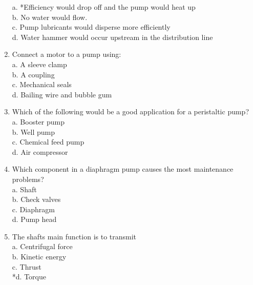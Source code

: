 \begin{enumerate}[1.]
a. *Efficiency would drop off and the pump would heat up\\
b. No water would flow.\\
c. Pump lubricants would disperse more efficiently\\
d. Water hammer would occur upstream in the distribution line\\
\item Connect a motor to a pump using:\\
a. A sleeve clamp\\
b. A coupling\\
c. Mechanical seals\\
d. Bailing wire and bubble gum\\
\item Which of the following would be a good application for a peristaltic pump?\\
a. Booster pump\\
b. Well pump\\
c. Chemical feed pump\\
d. Air compressor\\
\item Which component in a diaphragm pump causes the most maintenance problems?\\
a. Shaft\\
b. Check valves\\
c. Diaphragm\\
d. Pump head 


\item The shafts main function is to transmit   \\
a.  Centrifugal force\\
b.  Kinetic energy\\
c.  Thrust\\
*d.  Torque\\

\end{enumerate}



